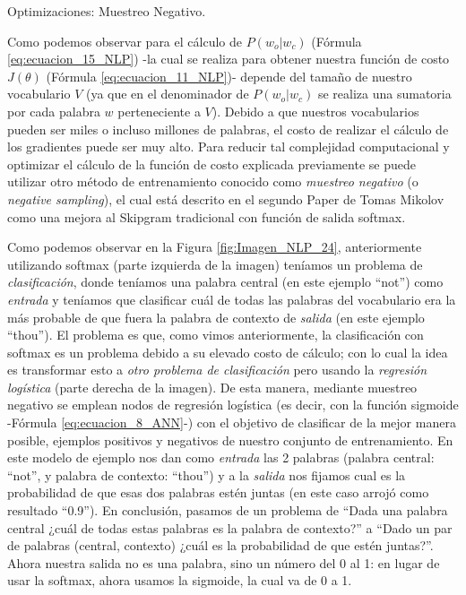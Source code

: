 \documentclass[12pt,a4paper]{article}
\makeatletter
\renewcommand\paragraph{\@startsection{paragraph}{4}{\z@}
            {-2.5ex\@plus -1ex \@minus -.25ex}
            {1.25ex \@plus .25ex}
            {\normalfont\normalsize\bfseries}}
\makeatother
\begin{document}
\begin{sloppypar}
\paragraph{Optimizaciones: Muestreo Negativo.}\label{neg_samp}

Como podemos observar para el cálculo de $P(w_o | w_c)$ (Fórmula \ref{eq:ecuacion_15_NLP}) -la cual se realiza para obtener nuestra función de costo $J(\theta)$  (Fórmula \ref{eq:ecuacion_11_NLP})- depende del tamaño de nuestro vocabulario $V$ (ya que en el denominador de $P(w_o | w_c)$ se realiza una sumatoria por cada palabra $w$ perteneciente a $V$). Debido a que nuestros vocabularios pueden ser miles o incluso millones de palabras, el costo de realizar el cálculo de los gradientes puede ser muy alto. Para reducir tal complejidad computacional y optimizar el cálculo de la función de costo explicada previamente se puede utilizar otro método de entrenamiento conocido como \textit{muestreo negativo} (o \textit{negative sampling}), el cual está descrito en el segundo Paper de Tomas Mikolov\cite{NLP_14} como una mejora al Skipgram tradicional con función de salida softmax.

Como podemos observar en la Figura \ref{fig:Imagen_NLP_24}, anteriormente utilizando softmax (parte izquierda de la imagen) teníamos un problema de \textit{clasificación}, donde teníamos una palabra central (en este ejemplo “not”) como \textit{entrada} y teníamos que clasificar cuál de todas las palabras del vocabulario era la más probable de que fuera la palabra de contexto de \textit{salida} (en este ejemplo “thou”).  El problema es que, como vimos anteriormente, la clasificación con softmax es un problema debido a su elevado costo de cálculo; con lo cual la idea es transformar esto a \textit{otro problema de clasificación} pero usando la \textit{regresión logística} (parte derecha de la imagen). De esta manera, mediante muestreo negativo se emplean nodos de regresión logística (es decir, con la función sigmoide -Fórmula \ref{eq:ecuacion_8_ANN}-) con el objetivo de clasificar de la mejor manera posible, ejemplos positivos y negativos de nuestro conjunto de entrenamiento\cite{NLP_13_2}. En este modelo de ejemplo nos dan como \textit{entrada} las 2 palabras (palabra central: “not”, y palabra de contexto: “thou”) y a la \textit{salida} nos fijamos cual es la probabilidad de que esas dos palabras estén juntas (en este caso arrojó como resultado “0.9”). En conclusión, pasamos de un problema de “Dada una palabra central ¿cuál de todas estas palabras es la palabra de contexto?” a “Dado un par de palabras (central, contexto) ¿cuál es la probabilidad de que estén juntas?”. Ahora nuestra salida no es una palabra, sino un número del 0 al 1: en lugar de usar la softmax, ahora usamos la sigmoide, la cual  va de 0 a 1. \\


\end{sloppypar}
\end{document}
